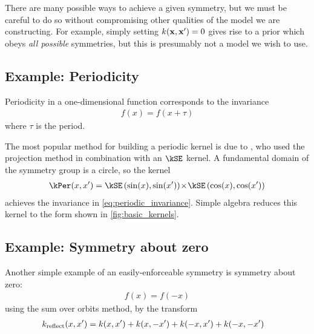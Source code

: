 %
There are many possible ways to achieve a given symmetry, but we must be careful to do so without compromising other qualities of the model we are constructing.
For example, simply setting $k({\bf{x}}, {\bf{x}}') = 0$ gives rise to a \gp{} prior which obeys \emph{all possible} symmetries, but this is presumably not a model we wish to use.






\subsection{Example: Periodicity}

Periodicity in a one-dimensional function corresponds to the invariance
%
\begin{align}
f(x) = f( x + \tau)
\label{eq:periodic_invariance}
\end{align}
%
where $\tau$ is the period.

The most popular method for building a periodic kernel is due to \citet{mackay1998introduction}, who used the projection method in combination with an $\kSE$ kernel.
A fundamental domain of the symmetry group is a circle, so the kernel
%
%
\begin{align}
\kPer(x, x') = \kSE \left( \sin(x), \sin(x') \right) \kerntimes \kSE \left( \cos(x), \cos(x') \right)
\end{align}
%
achieves the invariance in \cref{eq:periodic_invariance}.
Simple algebra reduces this kernel to the form shown in \cref{fig:basic_kernels}.


\subsection{Example: Symmetry about zero}

Another simple example of an easily-enforceable symmetry is symmetry about zero:
%
\begin{align}
f(x) = f( -x)
\end{align}
%
using the sum over orbits method, by the transform
%
\begin{align}
k_{\textnormal{reflect}}(x, x') & = k(x, x') + k(x, -x') + k(-x, x') + k(-x, -x')
\end{align}

